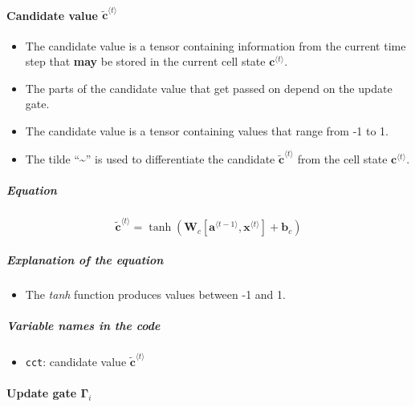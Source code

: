 \documentclass[11pt]{article}
\providecommand{\tightlist}{%
      \setlength{\itemsep}{0pt}\setlength{\parskip}{0pt}}
\begin{document}
    \hypertarget{candidate-value-tildemathbfclangle-t-rangle}{%
\paragraph{\texorpdfstring{Candidate value
\(\tilde{\mathbf{c}}^{\langle t \rangle}\)}{Candidate value \textbackslash tilde\{\textbackslash mathbf\{c\}\}\^{}\{\textbackslash langle t \textbackslash rangle\}}}\label{candidate-value-tildemathbfclangle-t-rangle}}

\begin{itemize}
\tightlist
\item
  The candidate value is a tensor containing information from the
  current time step that \textbf{may} be stored in the current cell
  state \(\mathbf{c}^{\langle t \rangle}\).
\item
  The parts of the candidate value that get passed on depend on the
  update gate.
\item
  The candidate value is a tensor containing values that range from -1
  to 1.
\item
  The tilde ``\textasciitilde{}'' is used to differentiate the candidate
  \(\tilde{\mathbf{c}}^{\langle t \rangle}\) from the cell state
  \(\mathbf{c}^{\langle t \rangle}\).
\end{itemize}

\hypertarget{equation}{%
\subparagraph{Equation}\label{equation}}

\[\mathbf{\tilde{c}}^{\langle t \rangle} = \tanh\left( \mathbf{W}_{c} [\mathbf{a}^{\langle t - 1 \rangle}, \mathbf{x}^{\langle t \rangle}] + \mathbf{b}_{c} \right) \tag{3}\]

\hypertarget{explanation-of-the-equation}{%
\subparagraph{Explanation of the
equation}\label{explanation-of-the-equation}}

\begin{itemize}
\tightlist
\item
  The \emph{tanh} function produces values between -1 and 1.
\end{itemize}

\hypertarget{variable-names-in-the-code}{%
\subparagraph{Variable names in the
code}\label{variable-names-in-the-code}}

\begin{itemize}
\tightlist
\item
  \texttt{cct}: candidate value
  \(\mathbf{\tilde{c}}^{\langle t \rangle}\)
\end{itemize}

    \hypertarget{update-gate-mathbfgamma_i}{%
\paragraph{\texorpdfstring{Update gate
\(\mathbf{\Gamma}_{i}\)}{Update gate \textbackslash mathbf\{\textbackslash Gamma\}\_\{i\}}}\label{update-gate-mathbfgamma_i}}
\end{document}
